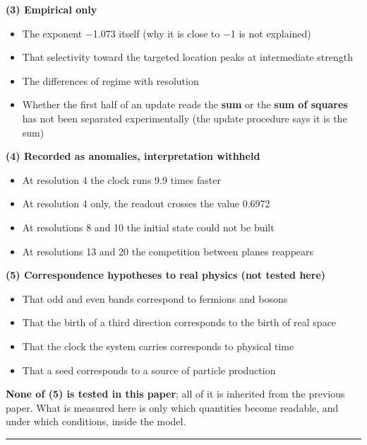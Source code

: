 \documentclass[
]{article}
\providecommand{\tightlist}{%
  \setlength{\itemsep}{0pt}\setlength{\parskip}{0pt}}
\begin{document}
\textbf{(3) Empirical only}

\begin{itemize}
\tightlist
\item
  The exponent −1.073 itself (why it is close to −1 is not explained)
\item
  That selectivity toward the targeted location peaks at intermediate
  strength
\item
  The differences of regime with resolution
\item
  Whether the first half of an update reads the \textbf{sum} or the
  \textbf{sum of squares} has not been separated experimentally (the
  update procedure says it is the sum)
\end{itemize}

\textbf{(4) Recorded as anomalies, interpretation withheld}

\begin{itemize}
\tightlist
\item
  At resolution 4 the clock runs 9.9 times faster
\item
  At resolution 4 only, the readout crosses the value 0.6972
\item
  At resolutions 8 and 10 the initial state could not be built
\item
  At resolutions 13 and 20 the competition between planes reappears
\end{itemize}

\textbf{(5) Correspondence hypotheses to real physics (not tested here)}

\begin{itemize}
\tightlist
\item
  That odd and even bands correspond to fermions and bosons
\item
  That the birth of a third direction corresponds to the birth of real
  space
\item
  That the clock the system carries corresponds to physical time
\item
  That a seed corresponds to a source of particle production
\end{itemize}

\textbf{None of (5) is tested in this paper}; all of it is inherited
from the previous paper. What is measured here is only which quantities
become readable, and under which conditions, inside the model.

\begin{center}\rule{0.5\linewidth}{0.5pt}\end{center}
\end{document}
